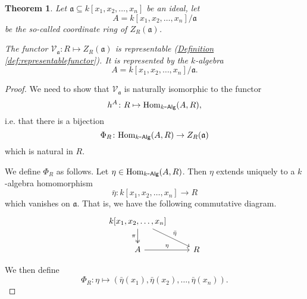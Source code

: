 \documentclass[a4paper,10pt]{scrreprt}
\newcommand{\Hom}{\mathrm{Hom}}
\def\mhyp{{\hbox{-}}}
\theoremstyle{definition}
\theoremstyle{plain}
\newtheorem{theorem}{Theorem}[section]
\theoremstyle{remark}
\begin{document}
\begin{theorem}
  Let $\mathfrak{a} \subseteq k[x_{1}, x_{2}, \ldots, x_{n}]$ be an ideal, let
  \begin{equation*}
    A = k[x_{1}, x_{2}, \ldots, x_{n}]/\mathfrak{a}
  \end{equation*}
  be the so-called \emph{coordinate ring} of $Z_{R}(\mathfrak{a})$.

  The functor $\mathcal{V}_{\mathfrak{a}}\colon R \mapsto Z_{R}(\mathfrak{a})$ is representable (\hyperref[def:representablefunctor]{Definition \ref*{def:representablefunctor}}). It is represented by the $k$-algebra 
  \begin{equation*}
    A = k[x_{1}, x_{2}, \ldots, x_{n}]/\mathfrak{a}.
  \end{equation*}
\end{theorem}
\begin{proof}
  We need to show that $\mathcal{V}_{\mathfrak{a}}$ is naturally isomorphic to the functor
  \begin{equation*}
    h^{A}\colon R \mapsto \Hom_{k\mhyp\mathsf{Alg}}(A, R),
  \end{equation*}
  i.e. that there is a bijection
  \begin{equation*}
    \Phi_{R}\colon \Hom_{k\mhyp\mathsf{Alg}}(A, R) \to Z_{R}(\mathfrak{a})
  \end{equation*}
  which is natural in $R$.

  We define $\Phi_{R}$ as follows. Let $\eta\in \Hom_{k\mhyp\mathsf{Alg}}(A, R)$. Then $\eta$ extends uniquely to a $k$-algebra homomorphism 
  \begin{equation*}
    \bar{\eta}\colon k[x_{1}, x_{2}, \ldots, x_{n}] \to R
  \end{equation*}
  which vanishes on $\mathfrak{a}$. That is, we have the following commutative diagram.
  \begin{equation*}
    \begin{tikzcd}
      k[x_{1}, x_{2}, \ldots, x_{n}]
      \arrow[d, twoheadrightarrow, swap, "\pi"]
      \arrow[dr, "\bar{\eta}"]
      \\
      A
      \arrow[r, "\eta"]
      & R
    \end{tikzcd}
  \end{equation*}

  We then define
  \begin{equation*}
    \Phi_{R}\colon \eta \mapsto (\bar{\eta}(x_{1}), \bar{\eta}(x_{2}), \ldots, \bar{\eta}(x_{n})).
  \end{equation*}


\end{proof}
\end{document}
